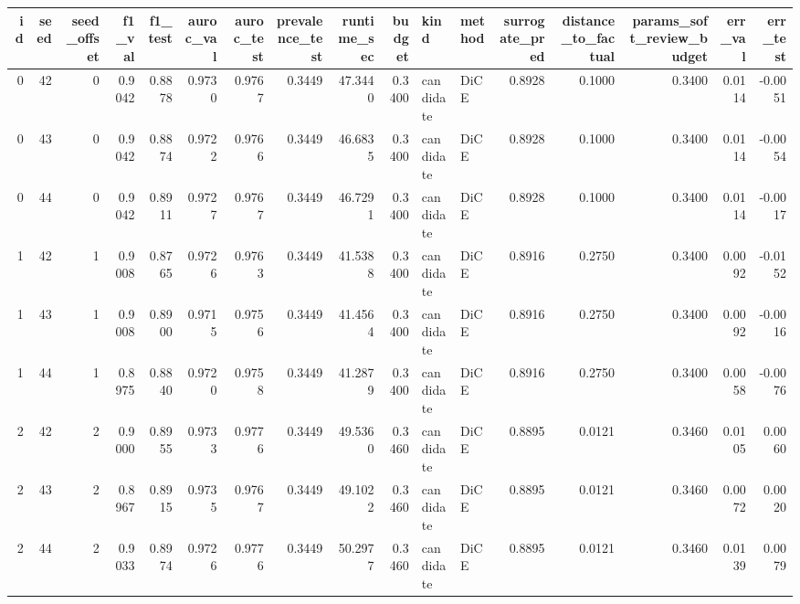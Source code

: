 \begin{tabular}{rrrrrrrrrrllrrrrr}
\toprule
 id &  seed &  seed\_offset &  f1\_val &  f1\_test &  auroc\_val &  auroc\_test &  prevalence\_test &  runtime\_sec &  budget &      kind & method &  surrogate\_pred &  distance\_to\_factual &  params\_soft\_review\_budget &  err\_val &  err\_test \\
\midrule
  0 &    42 &            0 &  0.9042 &   0.8878 &     0.9730 &      0.9767 &           0.3449 &      47.3440 &  0.3400 & candidate &   DiCE &          0.8928 &               0.1000 &                     0.3400 &   0.0114 &   -0.0051 \\
  0 &    43 &            0 &  0.9042 &   0.8874 &     0.9722 &      0.9766 &           0.3449 &      46.6835 &  0.3400 & candidate &   DiCE &          0.8928 &               0.1000 &                     0.3400 &   0.0114 &   -0.0054 \\
  0 &    44 &            0 &  0.9042 &   0.8911 &     0.9727 &      0.9767 &           0.3449 &      46.7291 &  0.3400 & candidate &   DiCE &          0.8928 &               0.1000 &                     0.3400 &   0.0114 &   -0.0017 \\
  1 &    42 &            1 &  0.9008 &   0.8765 &     0.9726 &      0.9763 &           0.3449 &      41.5388 &  0.3400 & candidate &   DiCE &          0.8916 &               0.2750 &                     0.3400 &   0.0092 &   -0.0152 \\
  1 &    43 &            1 &  0.9008 &   0.8900 &     0.9715 &      0.9756 &           0.3449 &      41.4564 &  0.3400 & candidate &   DiCE &          0.8916 &               0.2750 &                     0.3400 &   0.0092 &   -0.0016 \\
  1 &    44 &            1 &  0.8975 &   0.8840 &     0.9720 &      0.9758 &           0.3449 &      41.2879 &  0.3400 & candidate &   DiCE &          0.8916 &               0.2750 &                     0.3400 &   0.0058 &   -0.0076 \\
  2 &    42 &            2 &  0.9000 &   0.8955 &     0.9733 &      0.9776 &           0.3449 &      49.5360 &  0.3460 & candidate &   DiCE &          0.8895 &               0.0121 &                     0.3460 &   0.0105 &    0.0060 \\
  2 &    43 &            2 &  0.8967 &   0.8915 &     0.9735 &      0.9767 &           0.3449 &      49.1022 &  0.3460 & candidate &   DiCE &          0.8895 &               0.0121 &                     0.3460 &   0.0072 &    0.0020 \\
  2 &    44 &            2 &  0.9033 &   0.8974 &     0.9726 &      0.9776 &           0.3449 &      50.2977 &  0.3460 & candidate &   DiCE &          0.8895 &               0.0121 &                     0.3460 &   0.0139 &    0.0079 \\

\end{tabular}

